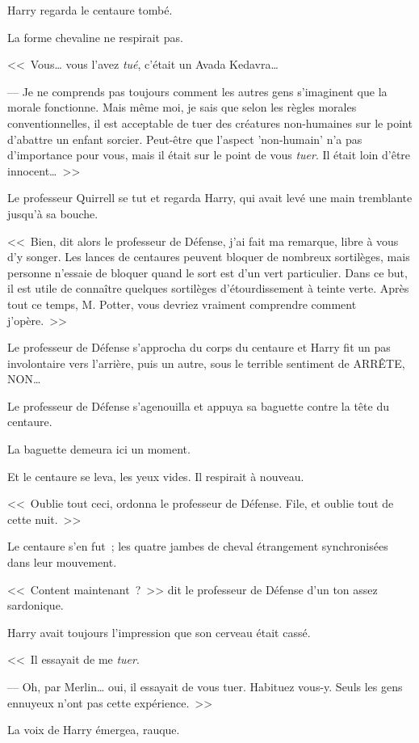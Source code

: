 Harry regarda le centaure tombé.

La forme chevaline ne respirait pas.

<<~Vous… vous l'avez \emph{tué}, c'était un Avada Kedavra…

--- Je ne comprends pas toujours comment les autres gens s'imaginent que la morale fonctionne. Mais même moi, je sais que selon les règles morales conventionnelles, il est acceptable de tuer des créatures non-humaines sur le point d'abattre un enfant sorcier. Peut-être que l'aspect 'non-humain' n'a pas d'importance pour vous, mais il était sur le point de vous \emph{tuer}. Il était loin d'être innocent…~>>

Le professeur Quirrell se tut et regarda Harry, qui avait levé une main tremblante jusqu'à sa bouche.

<<~Bien, dit alors le professeur de Défense, j'ai fait ma remarque, libre à vous d'y songer. Les lances de centaures peuvent bloquer de nombreux sortilèges, mais personne n'essaie de bloquer quand le sort est d'un vert particulier. Dans ce but, il est utile de connaître quelques sortilèges d'étourdissement à teinte verte. Après tout ce temps, M. Potter, vous devriez vraiment comprendre comment j'opère.~>>

Le professeur de Défense s'approcha du corps du centaure et Harry fit un pas involontaire vers l'arrière, puis un autre, sous le terrible sentiment de ARRÊTE, NON…

Le professeur de Défense s'agenouilla et appuya sa baguette contre la tête du centaure.

La baguette demeura ici un moment.

Et le centaure se leva, les yeux vides. Il respirait à nouveau.

<<~Oublie tout ceci, ordonna le professeur de Défense. File, et oublie tout de cette nuit.~>>

Le centaure s'en fut~; les quatre jambes de cheval étrangement synchronisées dans leur mouvement.

<<~Content maintenant~?~>> dit le professeur de Défense d'un ton assez sardonique.

Harry avait toujours l'impression que son cerveau était cassé.

<<~Il essayait de me \emph{tuer}.

--- Oh, par Merlin… oui, il essayait de vous tuer. Habituez vous-y. Seuls les gens ennuyeux n'ont pas cette expérience.~>>

La voix de Harry émergea, rauque.

